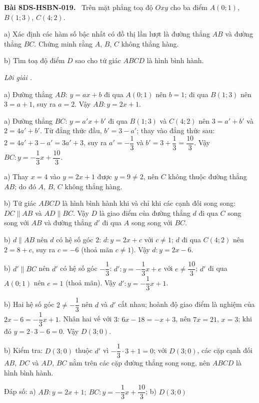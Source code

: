 \documentclass[12pt,a4paper]{article}
\newenvironment{problem}[1][]{\par\medskip\noindent\textbf{Bài #1.}\ }{\par}
\newenvironment{solution}[1][]{\par\noindent\textit{Lời giải #1.}\par}{\par}
\begin{document}
\begin{problem}[8DS-HSBN-019]
Trên mặt phẳng toạ độ $Oxy$ cho ba điểm $A(0; 1)$, $B(1; 3)$, $C(4; 2)$.

a) Xác định các hàm số bậc nhất có đồ thị lần lượt là đường thẳng $AB$ và đường thẳng $BC$. Chứng minh rằng $A$, $B$, $C$ không thẳng hàng.

b) Tìm toạ độ điểm $D$ sao cho tứ giác $ABCD$ là hình bình hành.

\begin{solution}
a) Đường thẳng $AB$: $y = ax + b$ đi qua $A(0; 1)$ nên $b = 1$; đi qua $B(1; 3)$ nên $3 = a + 1$, suy ra $a = 2$. Vậy $AB: y = 2x + 1$.

a) Đường thẳng $BC$: $y = a'x + b'$ đi qua $B(1; 3)$ và $C(4; 2)$ nên $3 = a' + b'$ và $2 = 4a' + b'$. Từ đẳng thức đầu, $b' = 3 - a'$; thay vào đẳng thức sau: $2 = 4a' + 3 - a' = 3a' + 3$, suy ra $a' = -\dfrac{1}{3}$ và $b' = 3 + \dfrac{1}{3} = \dfrac{10}{3}$. Vậy $BC: y = -\dfrac{1}{3}x + \dfrac{10}{3}$.

a) Thay $x = 4$ vào $y = 2x + 1$ được $y = 9 \neq 2$, nên $C$ không thuộc đường thẳng $AB$; do đó $A$, $B$, $C$ không thẳng hàng.

b) Tứ giác $ABCD$ là hình bình hành khi và chỉ khi các cạnh đối song song: $DC \parallel AB$ và $AD \parallel BC$. Vậy $D$ là giao điểm của đường thẳng $d$ đi qua $C$ song song với $AB$ và đường thẳng $d'$ đi qua $A$ song song với $BC$.

b) $d \parallel AB$ nên $d$ có hệ số góc $2$: $d: y = 2x + c$ với $c \neq 1$; $d$ đi qua $C(4; 2)$ nên $2 = 8 + c$, suy ra $c = -6$ (thoả mãn $c \neq 1$). Vậy $d: y = 2x - 6$.

b) $d' \parallel BC$ nên $d'$ có hệ số góc $-\dfrac{1}{3}$: $d': y = -\dfrac{1}{3}x + e$ với $e \neq \dfrac{10}{3}$; $d'$ đi qua $A(0; 1)$ nên $e = 1$ (thoả mãn). Vậy $d': y = -\dfrac{1}{3}x + 1$.

b) Hai hệ số góc $2 \neq -\dfrac{1}{3}$ nên $d$ và $d'$ cắt nhau; hoành độ giao điểm là nghiệm của $2x - 6 = -\dfrac{1}{3}x + 1$. Nhân hai vế với $3$: $6x - 18 = -x + 3$, nên $7x = 21$, $x = 3$; khi đó $y = 2 \cdot 3 - 6 = 0$. Vậy $D(3; 0)$.

b) Kiểm tra: $D(3; 0)$ thuộc $d'$ vì $-\dfrac{1}{3} \cdot 3 + 1 = 0$; với $D(3; 0)$, các cặp cạnh đối $AB$, $DC$ và $AD$, $BC$ nằm trên các cặp đường thẳng song song, nên $ABCD$ là hình bình hành.

Đáp số: a) $\boxed{AB: y = 2x + 1;\ BC: y = -\dfrac{1}{3}x + \dfrac{10}{3}}$; b) $\boxed{D(3; 0)}$
\end{solution}
\end{problem}
\end{document}
